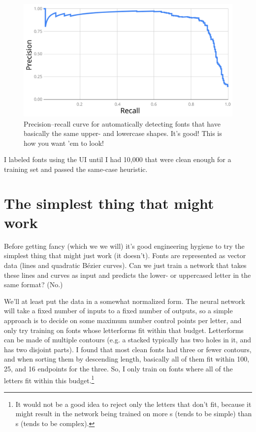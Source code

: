 \documentclass[twocolumn]{article}
\begin{document}
\begin{figure}[ht]
\centering
  \includegraphics[width=0.9 \linewidth]{samecasepr}
\caption{ Precision--recall curve for automatically detecting fonts
  that have basically the same upper- and lowercase shapes. It's good!
  This is how you want 'em to look!
} \label{fig:samecasepr}
\end{figure}

\medskip

I labeled fonts using the UI until I had 10,000 that were clean enough
for a training set and passed the same-case heuristic.

\section{The simplest thing that might work} \label{sec:vectorversion}

Before getting fancy (which we we will) it's good engineering hygiene
to try the simplest thing that might just work (it doesn't). Fonts
are represented as vector data (lines and quadratic B\'ezier curves).
Can we just train a network that takes these lines and curves as input
and predicts the lower- or uppercased letter in the same format? (No.)

We'll at least put the data in a somewhat normalized form. The neural
network will take a fixed number of inputs to a fixed number of
outputs, so a simple approach is to decide on some maximum number
control points per letter, and only try training on fonts whose
letterforms fit within that budget. Letterforms can be made of
multiple contours (e.g. a stacked  typically has two
holes in it, and  has two disjoint parts). I found that
most clean fonts had three or fewer contours, and when sorting them by
descending length, basically all of them fit within 100, 25, and 16
endpoints for the three. So, I only train on fonts where all of the
letters fit within this budget.\footnote{It would not be a good idea
  to reject only the letters that don't fit, because it might result
  in the network being trained on more s (tends to be
  simple) than s (tends to be complex).}
\end{document}
